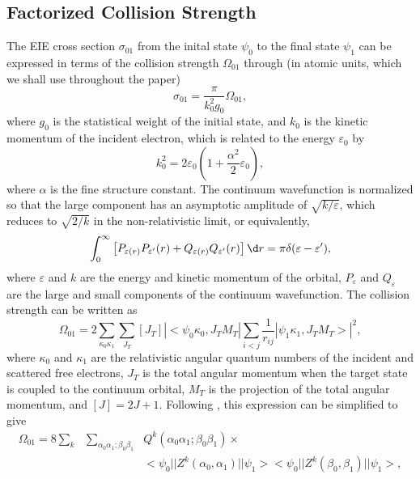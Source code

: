 \documentclass{elsart}
\begin{document}
\subsection{Factorized Collision Strength}
The EIE cross section $\sigma_{01}$ from the inital state $\psi_0$ to the final
state $\psi_1$ can be expressed in terms of the collision strength
$\Omega_{01}$ through (in atomic units, which we shall use throughout the
paper) 
\begin{equation}
\sigma_{01} = \frac{\pi}{k_0^2g_0}\Omega_{01},
\end{equation}
where $g_0$ is the statistical weight of the initial state, and $k_0$ is the
kinetic momentum of the incident electron, which is related to the energy
$\varepsilon_0$ by
\begin{equation}
k_0^2 = 2\varepsilon_0\left(1+\frac{\alpha^2}{2}\varepsilon_0\right),
\end{equation}
where $\alpha$ is the fine structure constant. The continuum wavefunction
is normalized so that the large component has an asymptotic amplitude of
$\sqrt{k/\varepsilon}$, which reduces to $\sqrt{2/k}$ in the non-relativistic
limit, or equivalently,
\begin{equation}
\int_0^\infty \left[P_{\varepsilon(r)}P_{\varepsilon^\prime}(r)
+Q_{\varepsilon(r)}Q_{\varepsilon^\prime}(r)\right]\d r = 
\pi\delta(\varepsilon - \varepsilon^\prime),
\end{equation}
where $\varepsilon$ and $k$ are the energy and kinetic momentum of the
orbital, $P_\varepsilon$ and $Q_\varepsilon$ are the large and small
components of the continuum wavefunction. The collision strength can be
written as
\begin{equation}
\Omega_{01} = 2\sum_{\kappa_0\kappa_1}\sum_{J_T}[J_T]
|<\psi_0\kappa_0,J_TM_T|\sum_{i<j}\frac{1}{r_{ij}}|\psi_1\kappa_1,J_TM_T>|^2,
\end{equation}
where $\kappa_0$ and $\kappa_1$ are the relativistic angular quantum numbers of
the incident and scattered free electrons, $J_T$ is the total angular momentum
when the target state is coupled to the continuum orbital, $M_T$ is the
projection 
of the total angular momentum, and  $[J] = 2J+1$. Following
\citet{barshalom88}, this expression can be simplified to give
\begin{eqnarray}
\label{eq_cs}
\Omega_{01} = 8\sum_{k}&\sum_{\alpha_0\alpha_1;\beta_0\beta_1}& 
Q^k(\alpha_0\alpha_1;\beta_0\beta_1)\times \nonumber\\ 
&&<\psi_0||Z^k(\alpha_0,\alpha_1)||\psi_1>
<\psi_0||Z^k(\beta_0,\beta_1)||\psi_1>,
\end{eqnarray}
\end{document}

